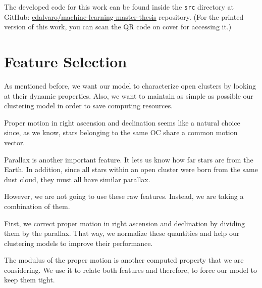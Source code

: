 \documentclass[11pt, a4paper, english]{book}
\begin{document}
The developed code for this work can be found inside the \verb|src| directory at GitHub:
\href{https://github.com/cdalvaro/machine-learning-master-thesis}{cdalvaro/machine-learning-master-thesis} repository.
(For the printed version of this work, you can scan the QR code on cover for accessing it.)

\section{Feature Selection}
\label{sec:feature_selection}

As mentioned before, we want our model to characterize open clusters by looking at their dynamic properties.
Also, we want to maintain as simple as possible our clustering model in order to save computing resources.

Proper motion in right ascension and declination seems like a natural choice since, as we know,
stars belonging to the same OC share a common motion vector.

Parallax is another important feature. It lets us know how far stars are from the Earth.
In addition, since all stars within an open cluster were born from the same dust cloud,
they must all have similar parallax.

However, we are not going to use these raw features. Instead, we are taking a combination of them.

First, we correct proper motion in right ascension and declination by dividing them by the parallax.
That way, we normalize these quantities and help our clustering models to improve their performance.

The modulus of the proper motion is another computed property that we are considering.
We use it to relate both features and therefore, to force our model to keep them tight.
\end{document}
